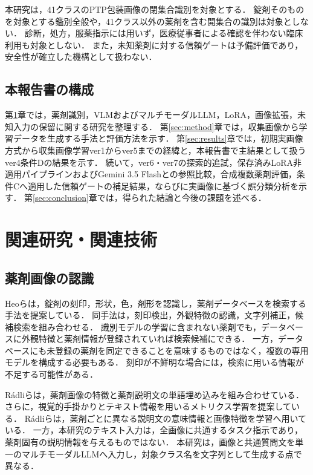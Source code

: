 \documentclass[uplatex,dvipdfmx]{jsarticle}
\begin{document}
本研究は，41クラスのPTP包装画像の閉集合識別を対象とする．
錠剤そのものを対象とする鑑別全般や，41クラス以外の薬剤を含む開集合の識別は対象としない．
診断，処方，服薬指示には用いず，医療従事者による確認を伴わない臨床利用も対象としない．
また，未知薬剤に対する信頼ゲートは予備評価であり，安全性が確立した機構として扱わない．

\subsection{本報告書の構成}

第\ref{sec:related}章では，薬剤識別，VLMおよびマルチモーダルLLM，LoRA，画像拡張，未知入力の保留に関する研究を整理する．
第\ref{sec:method}章では，収集画像から学習データを生成する手法と評価方法を示す．
第\ref{sec:results}章では，初期実画像方式から収集画像学習ver1からver5までの経緯と，本報告書で主結果として扱うver4条件Dの結果を示す．
続いて，ver6・ver7の探索的追試，保存済みLoRA非適用パイプラインおよびGemini 3.5 Flashとの参照比較，合成複数薬剤評価，条件Cへ適用した信頼ゲートの補足結果，ならびに実画像に基づく誤分類分析を示す．
第\ref{sec:conclusion}章では，得られた結論と今後の課題を述べる．

\clearpage

\section{関連研究・関連技術}\label{sec:related}

\subsection{薬剤画像の認識}

Heoらは，錠剤の刻印，形状，色，剤形を認識し，薬剤データベースを検索する手法を提案している\cite{heo2023pill}．
同手法は，刻印検出，外観特徴の認識，文字列補正，候補検索を組み合わせる．
識別モデルの学習に含まれない薬剤でも，データベースに外観特徴と薬剤情報が登録されていれば検索候補にできる．
一方，データベースにも未登録の薬剤を同定できることを意味するものではなく，複数の専用モデルを構成する必要もある．
刻印が不鮮明な場合には，検索に用いる情報が不足する可能性がある．

Rádliらは，薬剤画像の特徴と薬剤説明文の単語埋め込みを組み合わせている\cite{radli2024word}．
さらに，視覚的手掛かりとテキスト情報を用いるメトリクス学習を提案している\cite{radli2024metric}．
Rádliらは，薬剤ごとに異なる説明文の意味情報と画像特徴を学習へ用いている．
一方，本研究のテキスト入力は，全画像に共通するタスク指示であり，薬剤固有の説明情報を与えるものではない．
本研究は，画像と共通質問文を単一のマルチモーダルLLMへ入力し，対象クラス名を文字列として生成する点で異なる．
\end{document}
